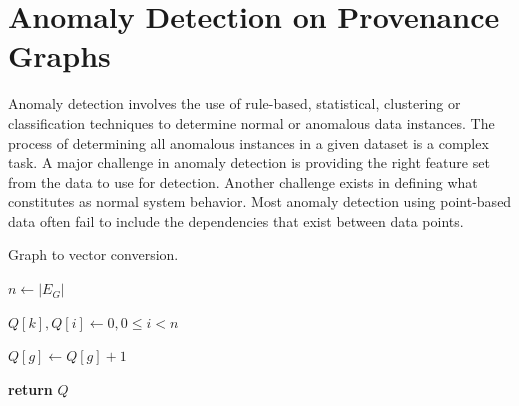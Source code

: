 \section{Anomaly Detection on Provenance Graphs}
Anomaly detection involves the use of rule-based, statistical, clustering or classification techniques to determine normal or anomalous data instances. The process of determining all anomalous instances in a given dataset is a complex task. A major challenge in anomaly detection is providing the right feature set from the data to use for detection. Another challenge exists in defining what constitutes as normal system behavior. Most anomaly detection using point-based data often fail to include the dependencies that exist between data points. 

\begin{algorithm}[h!]  
\caption{Graph to vector conversion.} 
 \label{graph_to_vector} 
\begin{algorithmic}[1]


\State $n \gets |E_G|$

\State $Q[k],Q[i] \gets 0, 0 \leq i < n$




\State $Q[g] \gets Q[g] + 1$
\EndIf

\EndFor

\EndFor


\State \textbf{return} $Q$

\EndProcedure

\end{algorithmic}
\end{algorithm}


